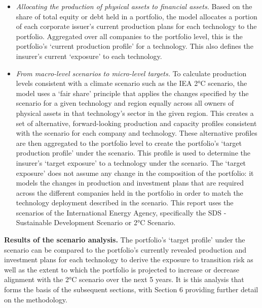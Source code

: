 \documentclass[10pt,table,a4]{article}\usepackage[]{graphicx}\usepackage[]{color}
\begin{document}
\begin{multicols}{2}
\begin{itemize}
			\item{\textit{Allocating the production of physical assets to financial assets.} Based on the share of total equity or debt held in a portfolio, the model allocates a portion of each corporate issuer's current production plans for each technology to the portfolio. Aggregated over all companies to the portfolio level, this is the portfolio's `current production profile' for a technology. This also defines the insurer's current `exposure' to each technology.}
			
			\item{\textit{From macro-level scenarios to micro-level targets. }To calculate production levels consistent with a climate scenario such as the IEA 2°C scenario, the model uses a `fair share' principle that applies the changes specified by the scenario for a given technology and region equally across all owners of physical assets in that technology's sector in the given region. This creates a set of alternative, forward-looking production and capacity profiles consistent with the scenario for each company and technology. These alternative profiles are then aggregated to the portfolio level to create the portfolio's `target production profile' under the scenario. This profile is used to determine the insurer's `target exposure' to a technology under the scenario. The `target exposure' does not assume any change in the composition of the portfolio: it models the changes in production and investment plans that are required across the different companies held in the portfolio in order to match the technology deployment described in the scenario. This report uses the scenarios of the International Energy Agency, specifically the SDS - Sustainable Development Scenario or 2°C Scenario.} 
			
		\end{itemize}
		
		\textbf{Results of the scenario analysis.} The portfolio's `target profile' under the scenario can be compared to the portfolio's currently revealed production and investment plans for each technology to derive the exposure to transition risk as well as the extent to which the portfolio is projected to increase or decrease alignment with the 2°C scenario over the next 5 years. It is this analysis that forms the basis of the subsequent sections, with Section 6 providing further detail on the methodology.	
		\newline
		
	\end{multicols}
	
\end{document}
